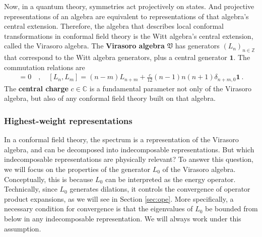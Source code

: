 \documentclass[12pt, a4paper]{article}
\theoremstyle{break}
\begin{document}
Now, in a quantum theory, symmetries act projectively on states. And projective representations of an algebra are equivalent to representations of that algebra's central extension. Therefore, the algebra that describes local conformal transformations in conformal field theory is the Witt algebra's central extension, called the Virasoro algebra. The \textbf{Virasoro algebra} $\mathfrak{V}$ has generators $(L_n)_{n\in\mathbb{Z}}$ that correspond to the Witt algebra generators, plus a central generator $\mathbf 1$. The commutation relations are 
 \begin{align}
  [\mathbf 1, L_n] = 0 \quad , \quad \boxed{[L_n,L_m] = (n-m)L_{n+m} +\frac{c}{12}(n-1)n(n+1)\delta_{n+m,0}\mathbf 1} \ .
  \label{vir}
 \end{align}
 The \textbf{central charge} $c\in\mathbb{C}$ is a fundamental parameter not only of the Virasoro algebra, but also of any conformal field theory built on that algebra. 

\subsubsection{Highest-weight representations}

In a conformal field theory, the spectrum is a representation of the Virasoro algebra, and can be decomposed into indecomposable representations. But which indecomposable representations are physically relevant? To answer this question, we will focus on the properties of the generator $L_0$ of the Virasoro algebra. Conceptually, this is because $L_0$ can be interpreted as the energy operator. Technically, since $L_0$ generates dilations, it controls the convergence of operator product expansions, as we will see in Section \ref{sec:ope}. More specifically, a necessary condition for convergence is that the eigenvalues of $L_0$ be bounded from below in any indecomposable representation. We will always work under this assumption.

\end{document}
